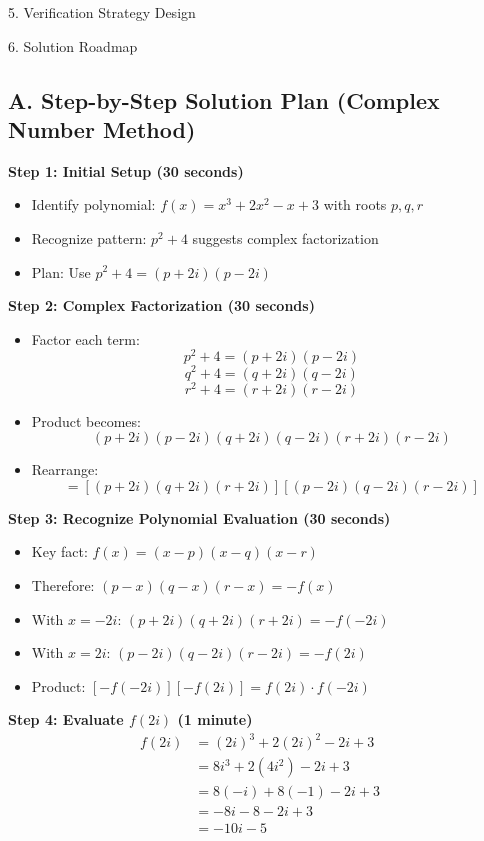 \documentclass[12pt]{article}
\begin{document}
\begin{verificationbox}{5. Verification Strategy Design}
\end{verificationbox}

\begin{roadmapbox}{6. Solution Roadmap}

\subsection*{A. Step-by-Step Solution Plan (Complex Number Method)}

\textbf{Step 1: Initial Setup (30 seconds)}
\begin{itemize}
    \item Identify polynomial: $f(x) = x^3 + 2x^2 - x + 3$ with roots $p, q, r$
    \item Recognize pattern: $p^2 + 4$ suggests complex factorization
    \item Plan: Use $p^2 + 4 = (p + 2i)(p - 2i)$
\end{itemize}

\textbf{Step 2: Complex Factorization (30 seconds)}
\begin{itemize}
    \item Factor each term:
    \[p^2 + 4 = (p + 2i)(p - 2i)\]
    \[q^2 + 4 = (q + 2i)(q - 2i)\]
    \[r^2 + 4 = (r + 2i)(r - 2i)\]
    
    \item Product becomes:
    \[(p + 2i)(p - 2i)(q + 2i)(q - 2i)(r + 2i)(r - 2i)\]
    
    \item Rearrange:
    \[= [(p + 2i)(q + 2i)(r + 2i)][(p - 2i)(q - 2i)(r - 2i)]\]
\end{itemize}

\textbf{Step 3: Recognize Polynomial Evaluation (30 seconds)}
\begin{itemize}
    \item Key fact: $f(x) = (x - p)(x - q)(x - r)$
    \item Therefore: $(p - x)(q - x)(r - x) = -f(x)$
    \item With $x = -2i$: $(p + 2i)(q + 2i)(r + 2i) = -f(-2i)$
    \item With $x = 2i$: $(p - 2i)(q - 2i)(r - 2i) = -f(2i)$
    \item Product: $[-f(-2i)][-f(2i)] = f(2i) \cdot f(-2i)$
\end{itemize}

\textbf{Step 4: Evaluate $f(2i)$ (1 minute)}
\begin{align*}
f(2i) &= (2i)^3 + 2(2i)^2 - 2i + 3\\
&= 8i^3 + 2(4i^2) - 2i + 3\\
&= 8(-i) + 8(-1) - 2i + 3\\
&= -8i - 8 - 2i + 3\\
&= -10i - 5
\end{align*}


\end{roadmapbox}
\end{document}
